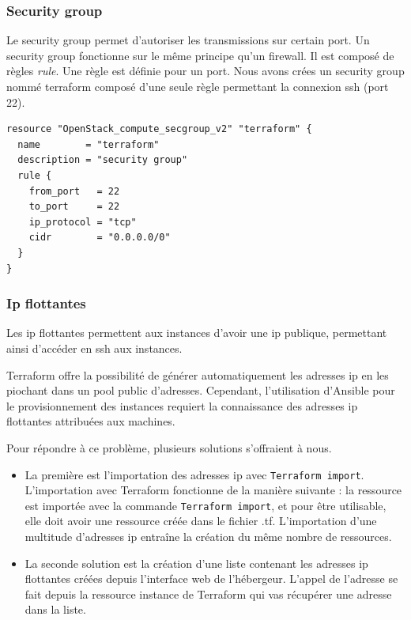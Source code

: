 \documentclass[]{article}
\begin{document}
\subsubsection{Security group}\label{security-group}
Le security group permet d'autoriser les transmissions sur certain port.
Un security group fonctionne sur le même principe qu'un firewall. Il est
composé de règles \emph{rule}. Une règle est définie pour un port. Nous
avons crées un security group nommé \og terraform
\fg composé d'une seule règle permettant la connexion ssh
(port 22).

\begin{verbatim}
resource "OpenStack_compute_secgroup_v2" "terraform" {
  name        = "terraform"
  description = "security group"
  rule {
    from_port   = 22
    to_port     = 22
    ip_protocol = "tcp"
    cidr        = "0.0.0.0/0"
  }
}
\end{verbatim}
\subsubsection{Ip flottantes}\label{ip-flottantes}
Les ip flottantes permettent aux instances d'avoir une ip publique, permettant ainsi d'accéder en ssh aux instances.

Terraform offre la possibilité de générer automatiquement les adresses ip en les
piochant dans un pool public d'adresses. Cependant, l'utilisation
d'Ansible pour le provisionnement des instances requiert la connaissance des adresses ip flottantes attribuées aux machines.

Pour répondre à ce problème, plusieurs solutions s'offraient à nous. 
\begin{itemize}
\item La première est l'importation des adresses ip avec
\texttt{Terraform\ import}. \\
L'importation avec Terraform fonctionne de la manière
suivante : la ressource est importée avec la commande \texttt{Terraform\ import}, et pour être
utilisable, elle doit avoir une ressource créée dans le fichier .tf.
L'importation d'une multitude d'adresses ip entraîne la création du
même nombre de ressources. 
\item La seconde solution est la création d'une liste contenant
les adresses ip flottantes créées depuis l'interface web de l'hébergeur.
L'appel de l'adresse se fait depuis la ressource instance de Terraform
qui vas récupérer une adresse dans la liste.
\end{itemize}
\end{document}
